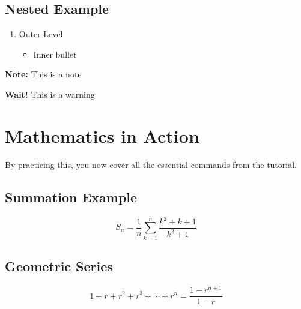 \documentclass{article}
\begin{document}
	\subsection{Nested Example}
	\begin{enumerate}
		\item Outer Level
		\begin{itemize}
			\item Inner bullet
		\end{itemize}
	\end{enumerate}
	
	\textbf{Note:} This is a note
	
	\textbf{Wait!} This is a warning
	
	\section{Mathematics in Action}
	By practicing this, you now cover all the essential commands from the tutorial.
	
	\subsection{Summation Example}
	\[
	S_n = \frac{1}{n} \sum_{k=1}^{n} \frac{k^2 + k + 1}{k^2 + 1}
	\]
	
	\subsection{Geometric Series}
	\[
	1 + r + r^2 + r^3 + \cdots + r^n = \frac{1 - r^{n+1}}{1-r}
	\]
	
\end{document}
